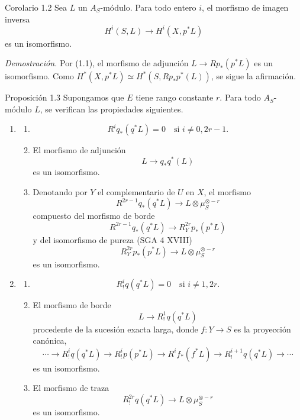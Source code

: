 \begin{statement}{Corolario 1.2}
Sea $L$ un $A_S$-módulo. Para todo entero $i$, el morfismo de imagen inversa
\[
H^i(S,L)\longrightarrow H^i(X,p^*L)
\]
es un isomorfismo.
\end{statement}

\emph{Demostración.} Por (1.1), el morfismo de adjunción $L\to Rp_*(p^*L)$ es un isomorfismo. Como $H^*(X,p^*L)\simeq H^*(S,Rp_*p^*(L))$, se sigue la afirmación.

\begin{statement}{Proposición 1.3}
Supongamos que $E$ tiene rango constante $r$. Para todo $A_S$-módulo $L$, se verifican las propiedades siguientes.
\begin{enumerate}[label=(\roman*)]
\item
\begin{enumerate}[label=\alph*)]
\item
\[
R^i q_*(q^*L)=0\quad\text{si }i\ne 0,2r-1.
\]
\item El morfismo de adjunción
\[
L\longrightarrow q_*q^*(L)
\]
es un isomorfismo.
\item Denotando por $Y$ el complementario de $U$ en $X$, el morfismo
\[
R^{2r-1}q_*(q^*L)\longrightarrow L\otimes\mu_S^{\otimes -r}
\]
compuesto del morfismo de borde
\[
R^{2r-1}q_*(q^*L)\longrightarrow R_Y^{2r}p_*(p^*L)
\tag{1}
\]
y del isomorfismo de pureza (SGA 4 XVIII)
\[
R_Y^{2r}p_*(p^*L)\longrightarrow L\otimes\mu_S^{\otimes -r}
\]
es un isomorfismo.
\end{enumerate}
\item
\begin{enumerate}[label=\alph*)]
\item
\[
R_!^i q(q^*L)=0\quad\text{si }i\ne 1,2r.
\]
\item El morfismo de borde
\[
L\longrightarrow R_!^1 q(q^*L)
\]
procedente de la sucesión exacta larga, donde $f:Y\to S$ es la proyección canónica,
\[
\cdots\longrightarrow R_!^i q(q^*L)\longrightarrow R_!^i p(p^*L)
\longrightarrow R^i f_*(f^*L)\longrightarrow R_!^{i+1}q(q^*L)\longrightarrow\cdots
\]
es un isomorfismo.
\item El morfismo de traza
\[
R_!^{2r}q(q^*L)\longrightarrow L\otimes\mu_S^{\otimes -r}
\]
es un isomorfismo.
\end{enumerate}
\end{enumerate}
\end{statement}
